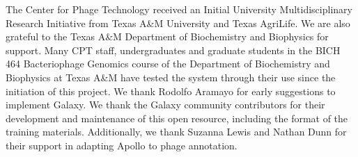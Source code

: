 The Center for Phage Technology received an Initial University
Multidisciplinary Research Initiative from Texas A\&M University and
Texas AgriLife. We are also grateful to the Texas A\&M Department of
Biochemistry and Biophysics for support. Many CPT staff, undergraduates
and graduate students in the BICH 464 Bacteriophage Genomics course of
the Department of Biochemistry and Biophysics at Texas A\&M have tested
the system through their use since the initiation of this project. We
thank Rodolfo Aramayo for early suggestions to implement Galaxy. We
thank the Galaxy community contributors for their development and
maintenance of this open resource, including the format of the training
materials. Additionally, we thank Suzanna Lewis and Nathan Dunn for
their support in adapting Apollo to phage annotation.


\footnotesize


\normalsize
